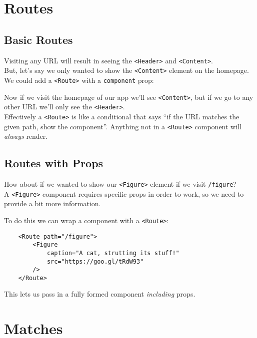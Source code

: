 \pagebreak


\section{Routes}

\subsection{Basic Routes}

Visiting any URL will result in seeing the \texttt{<Header>} and \texttt{<Content>}.
\\

But, let's say we only wanted to show the \texttt{<Content>} element on the homepage. We could add a \texttt{<Route>} with a \texttt{component} prop:


Now if we visit the homepage of our app we'll see \texttt{<Content>}, but if we go to any other URL we'll only see the \texttt{<Header>}.
\\

Effectively a \texttt{<Route>} is like a conditional that says ``if the URL matches the given path, show the component''. Anything not in a \texttt{<Route>} component will \textit{always} render.


\subsection{Routes with Props}

How about if we wanted to show our \texttt{<Figure>} element if we visit \texttt{/figure}?
\\

A \texttt{<Figure>} component requires specific props in order to work, so we need to provide a bit more information.

\pagebreak

To do this we can wrap a component with a \texttt{<Route>}:

\begin{verbatim}
    <Route path="/figure">
        <Figure
            caption="A cat, strutting its stuff!"
            src="https://goo.gl/tRdW93"
        />
    </Route>
\end{verbatim}

This lets us pass in a fully formed component \textit{including} props.



\section{Matches}

